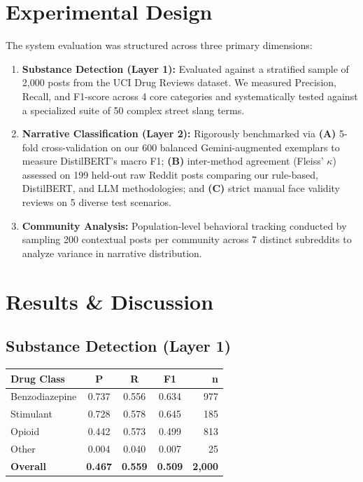 \documentclass[10pt,twocolumn]{article}
\begin{document}

\section{Experimental Design}

The system evaluation was structured across three primary dimensions:
\begin{enumerate}
  \item \textbf{Substance Detection (Layer 1):} Evaluated against a stratified sample of 2,000 posts from the UCI Drug Reviews dataset. We measured Precision, Recall, and F1-score across 4 core categories and systematically tested against a specialized suite of 50 complex street slang terms.
  \item \textbf{Narrative Classification (Layer 2):} Rigorously benchmarked via \textbf{(A)} 5-fold cross-validation on our 600 balanced Gemini-augmented exemplars to measure DistilBERT's macro F1; \textbf{(B)} inter-method agreement (Fleiss' $\kappa$) assessed on 199 held-out raw Reddit posts comparing our rule-based, DistilBERT, and LLM methodologies; and \textbf{(C)} strict manual face validity reviews on 5 diverse test scenarios.
  \item \textbf{Community Analysis:} Population-level behavioral tracking conducted by sampling 200 contextual posts per community across 7 distinct subreddits to analyze variance in narrative distribution.
\end{enumerate}

\section{Results \& Discussion}

\subsection{Substance Detection (Layer 1)}

\begin{center}{\small\setlength{\tabcolsep}{4pt}
\begin{tabular}{@{}lcccr@{}}
\toprule
\textbf{Drug Class} & \textbf{P} & \textbf{R} & \textbf{F1} & \textbf{n}\\
\midrule
Benzodiazepine & 0.737 & 0.556 & 0.634 &   977\\
Stimulant      & 0.728 & 0.578 & 0.645 &   185\\
Opioid         & 0.442 & 0.573 & 0.499 &   813\\
Other          & 0.004 & 0.040 & 0.007 &    25\\
\midrule
\textbf{Overall}&\textbf{0.467}&\textbf{0.559}&\textbf{0.509}&\textbf{2{,}000}\\
\bottomrule
\end{tabular}}\end{center}
\end{document}
